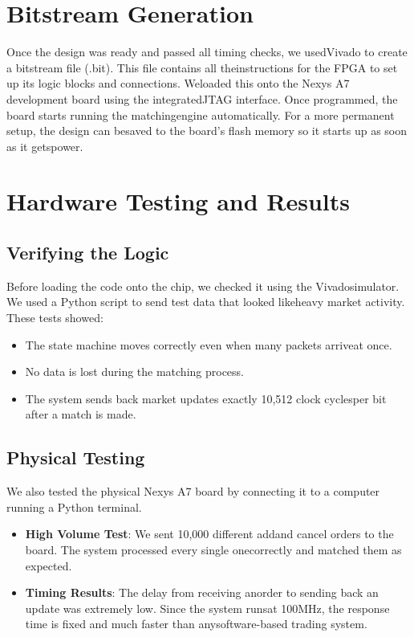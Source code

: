 \documentclass[conference,a4paper]{IEEEtran}
\begin{document}
\section{Bitstream ​Generation}
Once ​the ​design ​was ​ready ​and ​passed ​all ​timing ​checks, ​we ​used ​Vivado ​to ​create ​a bitstream ​file (.bit). ​This ​file ​contains ​all ​the ​instructions ​for ​the ​FPGA ​to ​set ​up ​its ​logic ​blocks ​and ​connections. ​We ​loaded ​this ​onto ​the ​Nexys ​A7 ​development ​board ​using ​the ​integrated ​JTAG ​interface. ​Once ​programmed, ​the ​board ​starts ​running ​the ​matching ​engine ​automatically. ​For ​a more ​permanent ​setup, ​the ​design ​can ​be ​saved ​to ​the ​board's ​flash ​memory ​so ​it ​starts ​up ​as ​soon ​as ​it ​gets ​power.

\section{Hardware ​Testing ​and ​Results}
\subsection{Verifying ​the ​Logic}
Before ​loading ​the ​code ​onto ​the ​chip, ​we ​checked ​it ​using ​the ​Vivado ​simulator. ​We ​used ​a Python ​script ​to ​send ​test ​data ​that ​looked ​like ​heavy ​market ​activity. ​These ​tests ​showed:
\begin{itemize}
    \item ​The ​state ​machine ​moves ​correctly ​even ​when ​many ​packets ​arrive ​at ​once.
    \item ​No ​data ​is ​lost ​during ​the ​matching ​process.
    \item ​The ​system ​sends ​back ​market ​updates ​exactly ​10,512 ​clock ​cycles ​per ​bit ​after ​a match ​is ​made.
\end{itemize}

\subsection{Physical ​Testing}
We ​also ​tested ​the ​physical ​Nexys ​A7 ​board ​by ​connecting ​it ​to ​a computer ​running ​a Python ​terminal.
\begin{itemize}
    \item \textbf{High ​Volume ​Test}: ​We ​sent ​10,000 ​different ​add ​and ​cancel ​orders ​to ​the ​board. ​The ​system ​processed ​every ​single ​one ​correctly ​and ​matched ​them ​as ​expected.
    \item \textbf{Timing ​Results}: ​The ​delay ​from ​receiving ​an ​order ​to ​sending ​back ​an ​update ​was ​extremely ​low. ​Since ​the ​system ​runs ​at ​100MHz, ​the ​response ​time ​is ​fixed ​and ​much ​faster ​than ​any ​software-based ​trading ​system.
\end{itemize}
\end{document}
